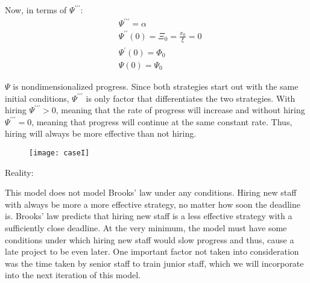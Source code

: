 \documentclass{article}
\newenvironment{atomize}
    {\begin{list} {} {
            \setlength\itemindent{0pt}
            \setlength\leftmargin{10pt}
            \setlength\labelwidth{0pt}
    }}
    {\end{list}}
\begin{document}
\begin{atomize}
\begin{atomize}
        \item Now, in terms of $\Psi^{\prime\prime\prime}$:
          \begin{align*}
            &\Psi^{\prime\prime\prime} = \alpha \\[6pt]
            &\Psi^{\prime\prime}(0) = \Xi_{0} = \frac{x_{0}}{\xi} = 0 \\[6pt]
            &\Psi^{\prime}(0) = \Phi_{0} \\[6pt]
            &\Psi(0) = \Psi_{0}
          \end{align*}

        \item $\Psi$ is nondimensionalized progress. Since both strategies start
        out with the same initial conditions, $\Psi^{\prime\prime\prime}$ 
        is only factor that differentiates the two strategies.  With hiring
        $\Psi^{\prime\prime\prime} > 0$, meaning that the rate of progress will
        increase and without hiring $\Psi^{\prime\prime\prime} = 0$, meaning
        that progress will continue at the same constant rate. Thus, hiring
        will always be more effective than not hiring. 
        \item 
          \begin{figure}[H]
            \centering
            \texttt{[image: caseI]}
          \end{figure}
      \end{atomize}

    \item Reality:
      \begin{atomize}
        \item This model does not model Brooks' law under any conditions.
        Hiring new staff with always be more a more effective strategy, no
        matter how soon the deadline is. Brooks' law predicts that hiring
        new staff is a less effective strategy with a sufficiently close
        deadline.  At the very minimum, the model must have some conditions
        under which hiring new staff would slow progress and thus, cause a
        late project to be even later. One important factor not taken into
        consideration was the time taken by senior staff to train junior
        staff, which we will incorporate into the next iteration of this
        model.
      \end{atomize}
  \end{atomize}
\end{document}
